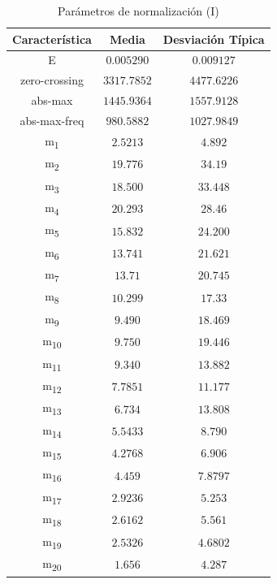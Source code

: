 \documentclass[12pt]{article}
\begin{document}
\begin{table}
	\caption{Parámetros de normalización (I)}
	\centering
		\begin{tabular}{||c c c||}
			\hline
			Característica & Media & Desviación Típica \\ [0.5ex]
			\hline\hline
			E & $0.005290$ & $0.009127$ \\
			\hline
			zero-crossing & $3317.7852$ & $4477.6226$ \\
			\hline
			abs-max & $1445.9364$ & $1557.9128$ \\
			\hline
			abs-max-freq & $980.5882$ & $1027.9849$ \\
			\hline
			m\textsubscript{1} & $2.5213$ & $4.892$ \\
			\hline
			m\textsubscript{2} & $19.776$ & $34.19$ \\
			\hline
			m\textsubscript{3} & $18.500$ & $33.448$ \\
			\hline
			m\textsubscript{4} & $20.293$ & $28.46$ \\
			\hline
			m\textsubscript{5} & $15.832$ & $24.200$ \\
			\hline
			m\textsubscript{6} & $13.741$ & $21.621$ \\
			\hline
			m\textsubscript{7} & $13.71$ & $20.745$ \\
			\hline
			m\textsubscript{8} & $10.299$ & $17.33$ \\
			\hline
			m\textsubscript{9} & $9.490$ & $18.469$ \\
			\hline
			m\textsubscript{10} & $9.750$ & $19.446$ \\
			\hline
			m\textsubscript{11} & $9.340$ & $13.882$ \\
			\hline
			m\textsubscript{12} & $7.7851$ & $11.177$ \\
			\hline
			m\textsubscript{13} & $6.734$ & $13.808$ \\
			\hline
			m\textsubscript{14} & $5.5433$ & $8.790$ \\
			\hline
			m\textsubscript{15} & $4.2768$ & $6.906$ \\
			\hline
			m\textsubscript{16} & $4.459$ & $7.8797$ \\
			\hline
			m\textsubscript{17} & $2.9236$ & $5.253$ \\
			\hline
			m\textsubscript{18} & $2.6162$ & $5.561$ \\
			\hline
			m\textsubscript{19} & $2.5326$ & $4.6802$ \\
			\hline
			m\textsubscript{20} & $1.656$ & $4.287$ \\
			\hline

\end{tabular}
\end{table}
\end{document}
